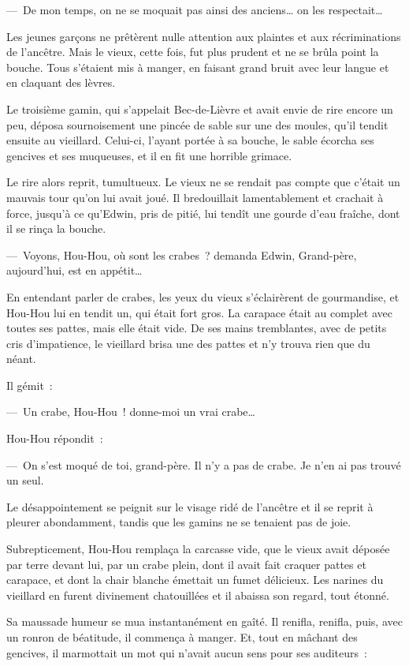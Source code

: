 \documentclass[french,twoside]{book} %
\begin{document}
— De mon temps, on ne se moquait pas ainsi des anciens… on les respectait…\par
Les jeunes garçons ne prêtèrent nulle attention aux plaintes et aux récriminations de l’ancêtre. Mais le vieux, cette fois, fut plus prudent et ne se brûla point la bouche. Tous s’étaient mis à manger, en faisant grand bruit avec leur langue et en claquant des lèvres.\par
Le troisième gamin, qui s’appelait Bec-de-Lièvre et avait envie de rire encore un peu, déposa sournoisement une pincée de sable sur une des moules, qu’il tendit ensuite au vieillard. Celui-ci, l’ayant portée à sa bouche, le sable écorcha ses gencives et ses muqueuses, et il en fit une horrible grimace.\par
Le rire alors reprit, tumultueux. Le vieux ne se rendait pas compte que c’était un mauvais tour qu’on lui avait joué. Il bredouillait lamentablement et crachait à force, jusqu’à ce qu’Edwin, pris de pitié, lui tendît une gourde d’eau fraîche, dont il se rinça la bouche.\par
— Voyons, Hou-Hou, où sont les crabes ? demanda Edwin, Grand-père, aujourd’hui, est en appétit…\par
En entendant parler de crabes, les yeux du vieux s’éclairèrent de gourmandise, et Hou-Hou lui en tendit un, qui était fort gros. La carapace était au complet avec toutes ses pattes, mais elle était vide. De ses mains tremblantes, avec de petits cris d’impatience, le vieillard brisa une des pattes et n’y trouva rien que du néant.\par
Il gémit :\par
— Un crabe, Hou-Hou ! donne-moi un vrai crabe…\par
Hou-Hou répondit :\par
— On s’est moqué de toi, grand-père. Il n’y a pas de crabe. Je n’en ai pas trouvé un seul.\par
Le désappointement se peignit sur le visage ridé de l’ancêtre et il se reprit à pleurer abondamment, tandis que les gamins ne se tenaient pas de joie.\par
Subrepticement, Hou-Hou remplaça la carcasse vide, que le vieux avait déposée par terre devant lui, par un crabe plein, dont il avait fait craquer pattes et carapace, et dont la chair blanche émettait un fumet délicieux. Les narines du vieillard en furent divinement chatouillées et il abaissa son regard, tout étonné.\par
Sa maussade humeur se mua instantanément en gaîté. Il renifla, renifla, puis, avec un ronron de béatitude, il commença à manger. Et, tout en mâchant des gencives, il marmottait un mot qui n’avait aucun sens pour ses auditeurs :\par
\end{document}
